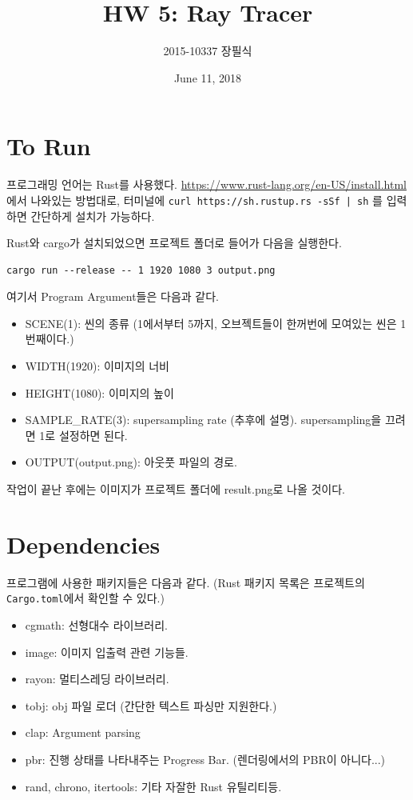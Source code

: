 \documentclass[11pt, a4paper]{article}
\title{HW 5: Ray Tracer}
\author{2015-10337 장필식}
\date{June 11, 2018}
\begin{document}
\maketitle

\section{To Run}

프로그래밍 언어는 Rust를 사용했다. 
\url{https://www.rust-lang.org/en-US/install.html}에서 나와있는 방법대로, 터미널에 \texttt{curl https://sh.rustup.rs -sSf | sh} 를 입력하면 간단하게 설치가 가능하다.

Rust와 cargo가 설치되었으면 프로젝트 폴더로 들어가 다음을 실행한다.

\begin{verbatim}
cargo run --release -- 1 1920 1080 3 output.png
\end{verbatim}

여기서 Program Argument들은 다음과 같다.

\begin{itemize}
  \item SCENE(1): 씬의 종류 (1에서부터 5까지, 오브젝트들이 한꺼번에 모여있는 씬은 1번째이다.)
  \item WIDTH(1920): 이미지의 너비
  \item HEIGHT(1080): 이미지의 높이
  \item SAMPLE\_RATE(3): supersampling rate (추후에 설명). supersampling을 끄려면 1로 설정하면 된다.
  \item OUTPUT(output.png): 아웃풋 파일의 경로.
\end{itemize}

작업이 끝난 후에는 이미지가 프로젝트 폴더에 result.png로 나올 것이다.

\section{Dependencies}

프로그램에 사용한 패키지들은 다음과 같다. (Rust 패키지 목록은 프로젝트의 \texttt{Cargo.toml}에서 확인할 수 있다.)

\begin{itemize}
  \item cgmath: 선형대수 라이브러리.
  \item image: 이미지 입출력 관련 기능들.
  \item rayon: 멀티스레딩 라이브러리.
  \item tobj: obj 파일 로더 (간단한 텍스트 파싱만 지원한다.)
  \item clap: Argument parsing
  \item pbr: 진행 상태를 나타내주는 Progress Bar. (렌더링에서의 PBR이 아니다...)
  \item rand, chrono, itertools: 기타 자잘한 Rust 유틸리티등.
\end{itemize}
\end{document}
